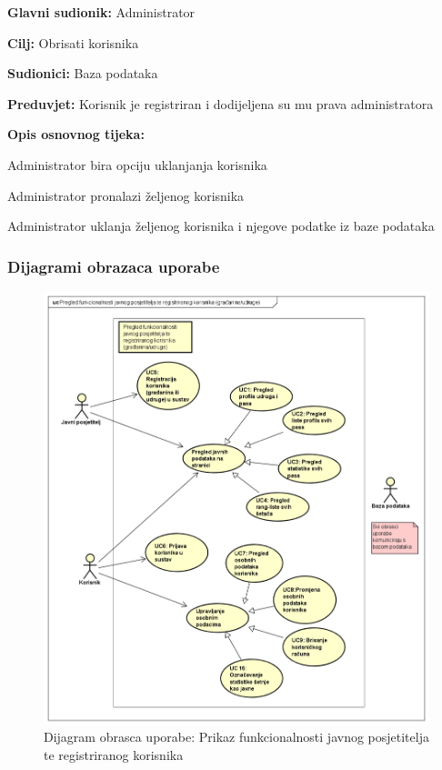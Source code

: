 	\noindent {}
	\begin{packed_item}
		
		\item \textbf{Glavni sudionik:} Administrator
		\item  \textbf{Cilj:} Obrisati korisnika
		\item  \textbf{Sudionici:} Baza podataka
		\item  \textbf{Preduvjet:} Korisnik je registriran i dodijeljena su mu prava administratora
		\item  \textbf{Opis osnovnog tijeka:}
		
		\item[] \begin{packed_enum}
			\item Administrator bira opciju uklanjanja korisnika
			\item Administrator pronalazi željenog korisnika
			\item Administrator uklanja željenog korisnika i njegove podatke iz baze podataka
		\end{packed_enum}
	\end{packed_item}
		

		\subsubsection{Dijagrami obrazaca uporabe}
				
				\begin{figure}[H]
					\includegraphics[scale=0.55]{dijagrami/usecase1.PNG} %
					\caption{Dijagram obrasca uporabe: Prikaz funkcionalnosti javnog posjetitelja te  registriranog korisnika}
					\label{fig:usecase1} %
				\end{figure}
			
